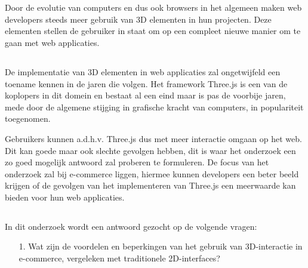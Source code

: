 
\chapter{}%
\label{ch:inleiding}

Door de evolutie van computers en dus ook browsers in het algemeen maken web developers steeds meer gebruik van 3D elementen in hun projecten. Deze elementen stellen de gebruiker in staat om op een compleet nieuwe manier om te gaan met web applicaties. 

\section{}%
\label{sec:probleemstelling}

De implementatie van 3D elementen in web applicaties zal ongetwijfeld een toename kennen in de jaren die volgen. Het framework Three.js is een van de koplopers in dit domein en bestaat al een eind maar is pas de voorbije jaren, mede door de algemene stijging in grafische kracht van computers, in populariteit toegenomen. 

Gebruikers kunnen a.d.h.v. Three.js dus met meer interactie omgaan op het web. Dit kan goede maar ook slechte gevolgen hebben, dit is waar het onderzoek een zo goed mogelijk antwoord zal proberen te formuleren. De focus van het onderzoek zal bij e-commerce liggen, hiermee kunnen developers een beter beeld krijgen of de gevolgen van het implementeren van Three.js een meerwaarde kan bieden voor hun web applicaties.

\section{}%
\label{sec:onderzoeksvraag}

In dit onderzoek wordt een antwoord gezocht op de volgende vragen:

\begin{itemize}
	\item[1.] Wat zijn de voordelen en beperkingen van het gebruik van 3D-interactie in e-commerce, vergeleken met traditionele 2D-interfaces?
	
\end{itemize}

